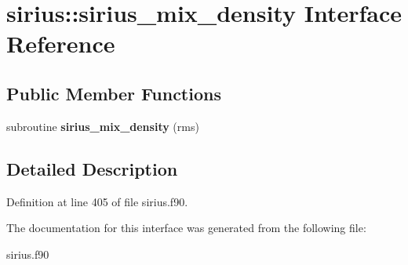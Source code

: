 \hypertarget{interfacesirius_1_1sirius__mix__density}{}\section{sirius\+:\+:sirius\+\_\+mix\+\_\+density Interface Reference}
\label{interfacesirius_1_1sirius__mix__density}
\subsection*{Public Member Functions}
\begin{DoxyCompactItemize}
\item 
\hypertarget{interfacesirius_1_1sirius__mix__density_a585f5276bbd393c83824b2f46f500baa}{}subroutine {\bfseries sirius\+\_\+mix\+\_\+density} (rms)\label{interfacesirius_1_1sirius__mix__density_a585f5276bbd393c83824b2f46f500baa}

\end{DoxyCompactItemize}


\subsection{Detailed Description}


Definition at line 405 of file sirius.\+f90.



The documentation for this interface was generated from the following file\+:\begin{DoxyCompactItemize}
\item 
sirius.\+f90\end{DoxyCompactItemize}
